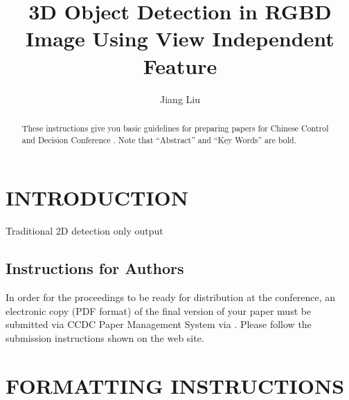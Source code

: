 \documentclass[english]{ccdconf}
\begin{document}
\title{3D Object Detection in RGBD Image Using View Independent Feature}
\author{Jiang Liu}



\maketitle

\begin{abstract}
These instructions give you basic guidelines for preparing papers
for Chinese Control and Decision Conference . Note that ``Abstract''
and ``Key Words'' are bold.
\end{abstract}



\section{INTRODUCTION}

Traditional 2D detection only output



\subsection{Instructions for Authors}

In order for the proceedings to be ready for distribution at the
conference, an electronic copy (PDF format) of the final version of
your paper must be submitted via CCDC Paper Management System via
. Please follow the submission
instructions shown on the web site.

\section{FORMATTING INSTRUCTIONS}
\end{document}
